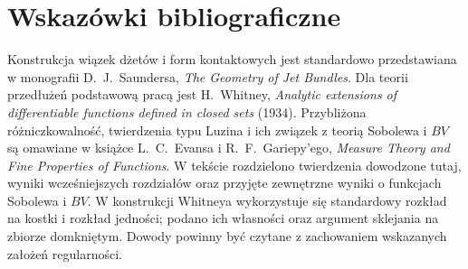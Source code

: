 \section*{Wskazówki bibliograficzne}
Konstrukcja wiązek dżetów i form kontaktowych jest standardowo
przedstawiana w monografii D.~J.~Saundersa,
\emph{The Geometry of Jet Bundles}. Dla teorii przedłużeń
podstawową pracą jest H.~Whitney,
\emph{Analytic extensions of differentiable functions defined
in closed sets} (1934). Przybliżona różniczkowalność,
twierdzenia typu Luzina i ich związek z teorią Sobolewa i $BV$
są omawiane w książce L.~C.~Evansa i R.~F.~Gariepy'ego,
\emph{Measure Theory and Fine Properties of Functions}.
W tekście rozdzielono twierdzenia dowodzone tutaj,
wyniki wcześniejszych rozdziałów oraz przyjęte
zewnętrzne wyniki o funkcjach Sobolewa i $BV$. W konstrukcji Whitneya wykorzystuje
się standardowy rozkład na kostki i rozkład jedności;
podano ich własności oraz argument sklejania na zbiorze
domkniętym. Dowody powinny być czytane z zachowaniem
wskazanych założeń regularności.
